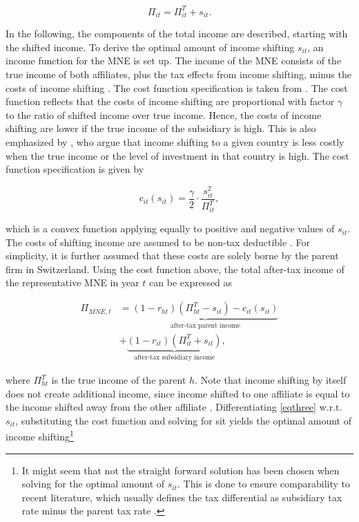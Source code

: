 \documentclass[10pt,twocolumn,oneside,cmyk]{article}
\begin{document}
\begin{equation}\label{eqone}
 \Pi_{it}=\Pi_{it}^T+s_{it}.
\end{equation}

In the following, the components of the total income are described, starting with the shifted income. To derive the optimal amount of income shifting $s_{it}$, an income function for the MNE is set up. The income of the MNE consists of the true income of both affiliates, plus the tax effects from income shifting, minus the costs of income shifting \parencites[285]{weichenrieder_profit_2009}[250]{dischinger_role_2014}. The cost function specification is taken from \textcite[159]{hines_fiscal_1994}. The cost function reflects that the costs of income shifting are proportional with factor $\gamma$ to the ratio of shifted income over true income. Hence, the costs of income shifting are lower if the true income of the subsidiary is high. This is also emphasized by \textcite[319]{haufler_corporate_2000}, who argue that income shifting to a given country is less costly when the true income or the level of investment in that country is high. The cost function specification is given by

\begin{equation}\label{eqtwo}
 c_{it}(s_{it})=\frac{\gamma}{2} \cdot \frac{s_{it}^2}{\Pi_{it}^T},
\end{equation}

which is a convex function applying equally to positive and negative values of $s_{it}$. The costs of
shifting income are assumed to be non-tax deductible \parencite[250]{dischinger_role_2014}. For simplicity, it is further assumed that these costs are solely borne by the parent firm in Switzerland. Using the cost function above, the total after-tax income of the representative MNE in year $t$ can be expressed as

\begin{equation}\label{eqthree}
 \begin{split}
  \Pi_{MNE,t} &=\underbrace{(1-r_{ht})(\Pi_{ht}^T-s_{it})-c_{it}({s_{it}})}_{\text{after-tax parent income}}\\
	&+\underbrace{(1-r_{it})(\Pi_{it}^T+s_{it})}_{\text{after-tax subsidiary income}},
 \end{split}
\end{equation}

where $\Pi_{ht}^T$ is the true income of the parent $h$. Note that income shifting by itself does not create additional income, since income shifted to one affiliate is equal to the income shifted away from the other affiliate \parencite[159]{hines_fiscal_1994}. Differentiating \cref{eqthree} w.r.t. $s_{it}$, substituting the cost function and solving for sit yields the optimal amount of income shifting\footnote{It might seem that not the straight forward solution has been chosen when solving for the optimal amount of $s_{it}$. This is done to ensure comparability to recent literature, which usually defines the tax differential as subsidiary tax rate minus the parent tax rate \parencite[for example][259]{dischinger_role_2014}.}
\end{document}
